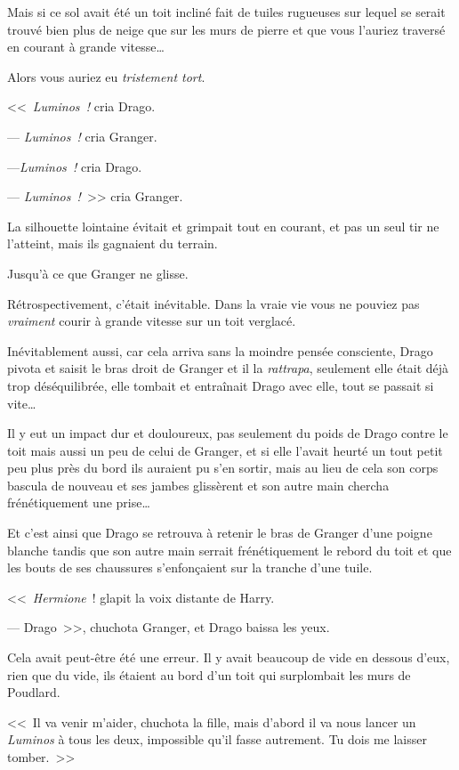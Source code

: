 Mais si ce sol avait été un toit incliné fait de tuiles rugueuses sur lequel se serait trouvé bien plus de neige que sur les murs de pierre et que vous l'auriez traversé en courant à grande vitesse…

Alors vous auriez eu \emph{tristement tort}.

<<~\emph{Luminos~!} cria Drago.

--- \emph{Luminos~!} cria Granger.

---\emph{Luminos~!} cria Drago.

--- \emph{Luminos~!}~>> cria Granger.

La silhouette lointaine évitait et grimpait tout en courant, et pas un seul tir ne l'atteint, mais ils gagnaient du terrain.

Jusqu'à ce que Granger ne glisse.

Rétrospectivement, c'était inévitable. Dans la vraie vie vous ne pouviez pas \emph{vraiment} courir à grande vitesse sur un toit verglacé.

Inévitablement aussi, car cela arriva sans la moindre pensée consciente, Drago pivota et saisit le bras droit de Granger et il la \emph{rattrapa}, seulement elle était déjà trop déséquilibrée, elle tombait et entraînait Drago avec elle, tout se passait si vite…

Il y eut un impact dur et douloureux, pas seulement du poids de Drago contre le toit mais aussi un peu de celui de Granger, et si elle l'avait heurté un tout petit peu plus près du bord ils auraient pu s'en sortir, mais au lieu de cela son corps bascula de nouveau et ses jambes glissèrent et son autre main chercha frénétiquement une prise…

Et c'est ainsi que Drago se retrouva à retenir le bras de Granger d'une poigne blanche tandis que son autre main serrait frénétiquement le rebord du toit et que les bouts de ses chaussures s'enfonçaient sur la tranche d'une tuile.

<<~\emph{Hermione}~! glapit la voix distante de Harry.

--- Drago~>>, chuchota Granger, et Drago baissa les yeux.

Cela avait peut-être été une erreur. Il y avait beaucoup de vide en dessous d'eux, rien que du vide, ils étaient au bord d'un toit qui surplombait les murs de Poudlard.

<<~Il va venir m'aider, chuchota la fille, mais d'abord il va nous lancer un \emph{Luminos} à tous les deux, impossible qu'il fasse autrement. Tu dois me laisser tomber.~>>

